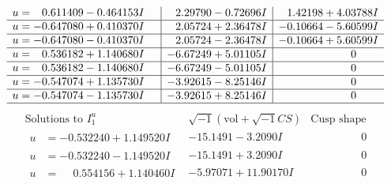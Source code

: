\documentclass[1p]{elsarticle_modified}
\theoremstyle{definition}
\newcommand{\I}{\sqrt{-1}}
\begin{document}
$$\begin{array}{c|c|c}
\begin{aligned}
u &= \phantom{-}0.611409 - 0.464153 I\end{aligned}
 & \phantom{-}2.29790 - 0.72696 I & \phantom{-}1.42198 + 4.03788 I \\ \hline\begin{aligned}
u &= -0.647080 + 0.410370 I\end{aligned}
 & \phantom{-}2.05724 + 2.36478 I & -0.10664 - 5.60599 I \\ \hline\begin{aligned}
u &= -0.647080 - 0.410370 I\end{aligned}
 & \phantom{-}2.05724 - 2.36478 I & -0.10664 + 5.60599 I \\ \hline\begin{aligned}
u &= \phantom{-}0.536182 + 1.140680 I\end{aligned}
 & -6.67249 + 5.01105 I & \phantom{-0.000000 } 0 \\ \hline\begin{aligned}
u &= \phantom{-}0.536182 - 1.140680 I\end{aligned}
 & -6.67249 - 5.01105 I & \phantom{-0.000000 } 0 \\ \hline\begin{aligned}
u &= -0.547074 + 1.135730 I\end{aligned}
 & -3.92615 - 8.25146 I & \phantom{-0.000000 } 0 \\ \hline\begin{aligned}
u &= -0.547074 - 1.135730 I\end{aligned}
 & -3.92615 + 8.25146 I & \phantom{-0.000000 } 0\\
 \hline 
 \end{array}$$\newpage$$\begin{array}{c|c|c}  
\text{Solutions to }I^u_{1}& \I (\text{vol} + \sqrt{-1}CS) & \text{Cusp shape}\\
 \hline 
\begin{aligned}
u &= -0.532240 + 1.149520 I\end{aligned}
 & -15.1491 - 3.2090 I & \phantom{-0.000000 } 0 \\ \hline\begin{aligned}
u &= -0.532240 - 1.149520 I\end{aligned}
 & -15.1491 + 3.2090 I & \phantom{-0.000000 } 0 \\ \hline\begin{aligned}
u &= \phantom{-}0.554156 + 1.140460 I\end{aligned}
 & -5.97071 + 11.90170 I & \phantom{-0.000000 } 0 \\ \hline\begin{aligned}

\end{aligned}
\end{array}$$
\end{document}
